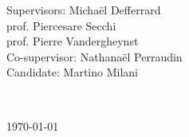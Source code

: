 \begin{titlepage}
\begin{minipage}{1\textwidth}
	\begin{flushleft} \large
		Supervisors: \hspace{0.3cm} Micha\"el Defferrard\\
		\hspace{3.2cm} prof. Piercesare Secchi\\
		\hspace{3.2cm} prof. Pierre Vandergheynst\\
		Co-supervisor:  Nathana\"el Perraudin\\
		\vspace{0.5cm}
		Candidate: \hspace{0.55cm} Martino Milani
		\end{flushleft}
	\vspace{2cm}
\end{minipage}
~

{\large \today } %
\vspace{0cm}
\end{titlepage}